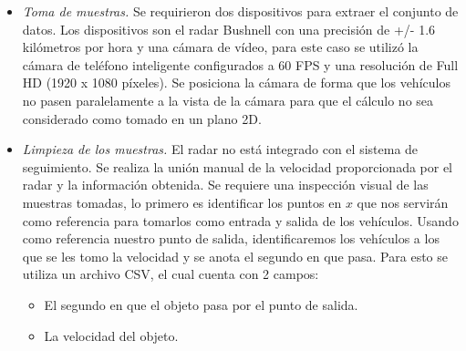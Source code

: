 \documentclass{llncs}
\begin{document}
\renewcommand{\labelitemi}{$-$}
\renewcommand{\labelitemii}{$\cdot$}
\begin{itemize}
    \item \textit{Toma de muestras.}  Se requirieron dos dispositivos para extraer el conjunto de datos. Los dispositivos son el radar Bushnell con una precisión de +/- 1.6 kilómetros por hora y una cámara de vídeo, para este caso se utilizó la cámara de teléfono inteligente configurados a 60 FPS y una resolución de Full HD (1920 x 1080 píxeles). Se posiciona la cámara de forma que los vehículos no pasen paralelamente a la vista de la cámara para que el cálculo no sea considerado como tomado en un plano 2D.  
    \item \textit{Limpieza de los muestras.} El radar no está integrado con el sistema de seguimiento. Se realiza la unión manual de la velocidad proporcionada por el radar y la información obtenida. Se requiere una inspección visual de las muestras tomadas, lo primero es identificar los puntos en $x$ que nos servirán como referencia para tomarlos como entrada y salida de los vehículos. Usando como referencia nuestro punto de salida, identificaremos los vehículos a los que se les tomo la velocidad y se anota el segundo en que pasa. Para esto se utiliza un archivo CSV, el cual cuenta con 2 campos:
     
        \begin{itemize}
            \item El segundo en que el objeto pasa por el punto de salida.
            \item La velocidad del objeto.
        \end{itemize}
        

\end{itemize}
\end{document}
